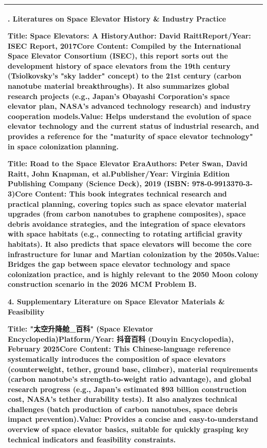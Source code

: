 \begin{longtable}[]{@{}
  >{\raggedright\arraybackslash}p{}@{}}
3. Literatures on Space Elevator History \& Industry Practice

Title: Space Elevators: A HistoryAuthor: David RaittReport/Year: ISEC
Report, 2017Core Content: Compiled by the International Space Elevator
Consortium (ISEC), this report sorts out the development history of
space elevators from the 19th century (Tsiolkovsky's "sky ladder"
concept) to the 21st century (carbon nanotube material breakthroughs).
It also summarizes global research projects (e.g., Japan's Obayashi
Corporation's space elevator plan, NASA's advanced technology research)
and industry cooperation models.Value: Helps understand the evolution of
space elevator technology and the current status of industrial research,
and provides a reference for the "maturity of space elevator technology"
in space colonization planning.

Title: Road to the Space Elevator EraAuthors: Peter Swan, David Raitt,
John Knapman, et al.Publisher/Year: Virginia Edition Publishing Company
(Science Deck), 2019 (ISBN: 978-0-9913370-3-3)Core Content: This book
integrates technical research and practical planning, covering topics
such as space elevator material upgrades (from carbon nanotubes to
graphene composites), space debris avoidance strategies, and the
integration of space elevators with space habitats (e.g., connecting to
rotating artificial gravity habitats). It also predicts that space
elevators will become the core infrastructure for lunar and Martian
colonization by the 2050s.Value: Bridges the gap between space elevator
technology and space colonization practice, and is highly relevant to
the 2050 Moon colony construction scenario in the 2026 MCM Problem B.

4. Supplementary Literature on Space Elevator Materials \& Feasibility

Title: "太空升降舱\_百科" (Space Elevator Encyclopedia)Platform/Year:
抖音百科 (Douyin Encyclopedia), February 2025Core Content: This
Chinese-language reference systematically introduces the composition of
space elevators (counterweight, tether, ground base, climber), material
requirements (carbon nanotube's strength-to-weight ratio advantage), and
global research progress (e.g., Japan's estimated \$93 billion
construction cost, NASA's tether durability tests). It also analyzes
technical challenges (batch production of carbon nanotubes, space debris
impact prevention).Value: Provides a concise and easy-to-understand
overview of space elevator basics, suitable for quickly grasping key
technical indicators and feasibility constraints. \\
\bottomrule
\end{longtable}

